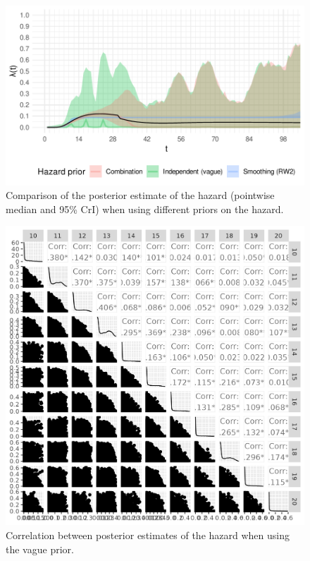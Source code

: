 \documentclass[thesis.tex]{subfiles}
\begin{document}
\begin{figure}
  \centering \includegraphics{cis-perfect-testing/hazard-results}
  \caption{Comparison of the posterior estimate of the hazard (pointwise median and 95\% CrI) when using different priors on the hazard. \label{perf-test:fig:hazard-results}}
\end{figure}

\begin{figure}
  \centering \includegraphics{cis-perfect-testing/hazard-pairs-results}
  \caption{Correlation between posterior estimates of the hazard when using the vague prior. \label{perf-test:fig:hazard-pairs-results}}
\end{figure}
\end{document}
